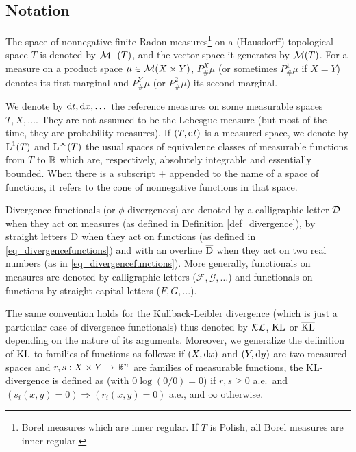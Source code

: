 \subsection{Notation}
\label{sec_notation}
%
The space of nonnegative finite Radon measures\footnote{Borel measures which are inner regular. If $T$ is Polish, all Borel measures are inner regular.}  on a (Hausdorff) topological space $T$ is denoted by $\mathcal{M}_+(T)$, and the vector space it generates by $\mathcal{M}(T)$. For a measure on a product space $\mu\in \mathcal{M}(X \times Y)$, $P^X_\# \mu$ (or sometimes $P^1_\# \mu$ if $X=Y$) denotes its first marginal and $P^Y_\# \mu$ (or $P^2_\# \mu$) its second marginal.
%

We denote by $\mathrm{d} t, \mathrm{d} x, \dots$ the reference measures on some measurable spaces $T,X,\dots$. They are not assumed to be the Lebesgue measure (but most of the time, they are probability measures). If $(T,\mathrm{d} t)$ is a measured space, we denote by $\text{\upshape L}^1(T)$ and $\text{\upshape L}^\infty(T)$ the usual spaces of equivalence classes of measurable functions from $T$ to $\mathbb{R}$ which are, respectively, absolutely integrable and essentially bounded. When there is a subscript $+$ appended to the name of a space of functions, it refers to the cone of nonnegative functions in that space.

Divergence functionals (or $\phi$-divergences) are denoted by a calligraphic letter $\operatorname{\mathcal{D}}$ when they act on measures (as defined in Definition \ref{def_divergence}), by straight letters $\operatorname{D}$ when they act on functions (as defined in \eqref{eq_divergencefunctions}) and with an overline $\overline{\operatorname{D}}$ when they act on two real numbers (as in \eqref{eq_divergencefunctions}). More generally, functionals on measures are denoted by calligraphic letters ($\mathcal{F}, \mathcal{G},\dots$) and functionals on functions by straight capital letters ($F,G,\dots$).

The same convention holds for the Kullback-Leibler divergence (which is just a particular case of divergence functionals) thus denoted by $\operatorname{\mathcal{KL}}$, $\operatorname{KL}$ or $\overline{\operatorname{KL}}$ depending on the nature of its arguments. Moreover, we generalize the definition of $\operatorname{KL}$ to families of functions as follows: if $(X, \mathrm{d} x)$ and $(Y,\mathrm{d} y)$ are two measured spaces and $r,s : X\times Y \to \mathbb{R}^n$ are families of measurable functions, the KL-divergence is defined as
(with $0\log(0/0)=0$) if $r,s\geq0$ a.e.\ and $(s_i(x,y)=0) \Rightarrow (r_i(x,y)=0)$ a.e., and $\infty$ otherwise.


